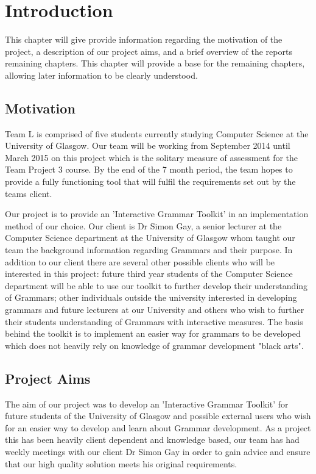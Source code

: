 \chapter{Introduction}
This chapter will give provide information regarding the motivation of the project, a description of our project aims, and a brief overview of the reports remaining chapters. This chapter will provide a base for the remaining chapters, allowing later information to be clearly understood.

\label{introduction}

\section{Motivation}
Team L is comprised of five students currently studying Computer Science at the University of Glasgow. Our team will be working from September 2014 until March 2015 on this project which is the solitary measure of assessment for the Team Project 3 course. By the end of the 7 month period, the team hopes to provide a fully functioning tool that will fulfil the requirements set out by the teams client. 

Our project is to provide an 'Interactive Grammar Toolkit' in an implementation method of our choice. Our client is Dr Simon Gay, a senior lecturer at the Computer Science department at the University of Glasgow whom taught our team the background information regarding Grammars and their purpose. In addition to our client there are several other possible clients who will be interested in this project: future third year students of the Computer Science department will be able to use our toolkit to further develop their understanding of Grammars; other individuals outside the university interested in developing grammars and future lecturers at our University and others who wish to further their students understanding of Grammars with interactive measures.  The basis behind the toolkit is to implement an easier way for grammars to be developed which does not heavily rely on knowledge of grammar development "black arts".

\section{Project Aims}
The aim of our project was to develop an 'Interactive Grammar Toolkit' for future students of the University of Glasgow and possible external users who wish for an easier way to develop and learn about Grammar development. As a project this has been heavily client dependent and knowledge based, our team has had weekly meetings with our client Dr Simon Gay in order to gain advice and ensure that our high quality solution meets his original requirements. 

